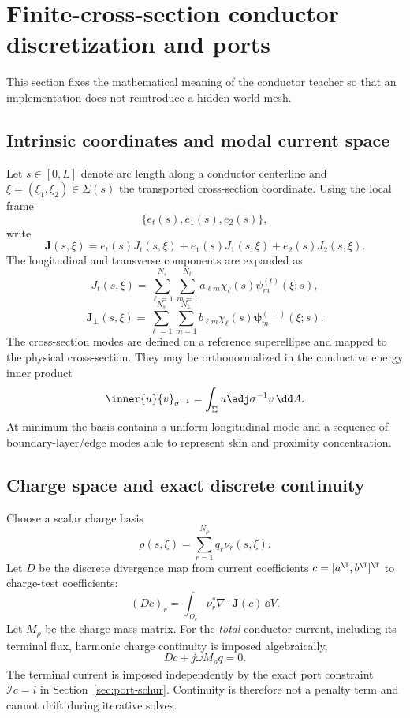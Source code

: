 \section{Finite-cross-section conductor discretization and ports}
\label{sec:conductor-discretization}

This section fixes the mathematical meaning of the conductor teacher so that an
implementation does not reintroduce a hidden world mesh.

\subsection{Intrinsic coordinates and modal current space}

Let $s\in[0,L]$ denote arc length along a conductor centerline and
$\xi=(\xi_1,\xi_2)\in\Sigma(s)$ the transported cross-section coordinate.
Using the local frame
\[
  \{e_t(s),e_1(s),e_2(s)\},
\]
write
\[
 \mathbf J(s,\xi)
 =
 e_t(s)J_t(s,\xi)
 +e_1(s)J_1(s,\xi)
 +e_2(s)J_2(s,\xi).
\]
The longitudinal and transverse components are expanded as
\[
 J_t(s,\xi)
 =
 \sum_{\ell=1}^{N_s}\sum_{m=1}^{N_t}
 a_{\ell m}\chi_\ell(s)\psi_m^{(t)}(\xi;s),
\]
\[
 \mathbf J_\perp(s,\xi)
 =
 \sum_{\ell=1}^{N_s}\sum_{m=1}^{N_\perp}
 b_{\ell m}\chi_\ell(s)\bm\psi_m^{(\perp)}(\xi;s).
\]
The cross-section modes are defined on a reference superellipse and mapped to
the physical cross-section. They may be orthonormalized in the conductive
energy inner product
\[
 \inner{u}{v}_{\sigma^{-1}}
 =
 \int_{\Sigma}
 u\adj\sigma^{-1}v\,\dd A .
\]
At minimum the basis contains a uniform longitudinal mode and a sequence of
boundary-layer/edge modes able to represent skin and proximity concentration.

\subsection{Charge space and exact discrete continuity}

Choose a scalar charge basis
\[
  \rho(s,\xi)
  =
  \sum_{r=1}^{N_\rho} q_r\nu_r(s,\xi).
\]
Let $D$ be the discrete divergence map from current coefficients
$c=[a^\T,b^\T]^\T$ to charge-test coefficients:
\[
  (Dc)_r
  =
  \int_{\Omega_c}
  \nu_r^\ast\nabla\cdot\mathbf J(c)\,\dd V .
\]
Let $M_\rho$ be the charge mass matrix. For the \emph{total} conductor
current, including its terminal flux, harmonic charge continuity is imposed
algebraically,
\[
  Dc+j\omega M_\rho q=0.
  \label{eq:discrete-continuity}
\]
The terminal current is imposed independently by the exact port constraint
$\mathcal I c=i$ in Section~\ref{sec:port-schur}. Continuity is therefore not
a penalty term and cannot drift during iterative solves.


